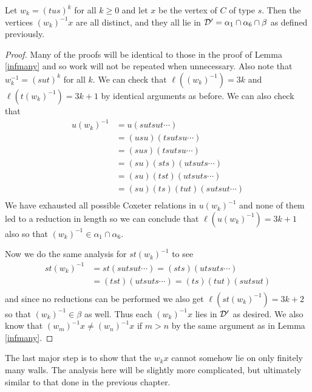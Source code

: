 \documentclass[class=book, crop=false]{standalone}
\begin{document}
\begin{lemma}
	\label{336f2infmany}
	Let $w_k=(tus)^k$ for all $k\ge 0$ and let $x$ be the vertex of $C$ of type $s.$ Then the vertices $(w_k)^{-1}x$ are all distinct, and they all lie in $\mathcal{D}'=\alpha_1\cap \alpha_6\cap\beta$ as defined previously.
\end{lemma}
\begin{proof}
	Many of the proofs will be identical to those in the proof of Lemma \ref{infmany} and so work will not be repeated when unnecessary. Also note that $w_k^{-1}=(sut)^k$ for all $k.$ We can check that $\ell((w_k)^{-1})=3k$ and $\ell(t(w_k)^{-1})=3k+1$ by identical arguments as before. We can also check that
	\begin{align*}
		u(w_k)^{-1}&=u(sutsut\cdots)\\
		    &=(usu)(tsutsu\cdots)\\
		    &=(sus)(tsutsu\cdots)\\
		    &=(su)(sts)(utsuts\cdots)\\
		    &=(su)(tst)(utsuts\cdots)\\
		    &=(su)(ts)(tut)(sutsut\cdots)\\
	\end{align*}
	We have exhausted all possible Coxeter relations in $u(w_k)^{-1}$ and none of them led to a reduction in length so we can conclude that $\ell(u(w_k)^{-1})=3k+1$ also so that $(w_k)^{-1}\in \alpha_1\cap \alpha_6.$

	Now we do the same analysis for $st(w_k)^{-1}$ to see
\begin{align*}
	st(w_k)^{-1}&=st(sutsut\cdots)=(sts)(utsuts\cdots)\\
	     &=(tst)(utsuts\cdots)=(ts)(tut)(sutsut)\\
\end{align*}
and since no reductions can be performed we also get $\ell(st(w_k)^{-1})=3k+2$ so that $(w_k)^{-1}\in \beta$ as well. Thus each $(w_k)^{-1}x$ lies in $\mathcal{D}'$ as desired. We also know that $(w_m)^{-1}x\neq (w_n)^{-1}x$ if $m>n$ by the same argument as in Lemma \ref{infmany}.
\end{proof}

The last major step is to show that the $w_kx$ cannot somehow lie on only finitely many walls. The analysis here will be slightly more complicated, but ultimately similar to that done in the previous chapter.
\end{document}
